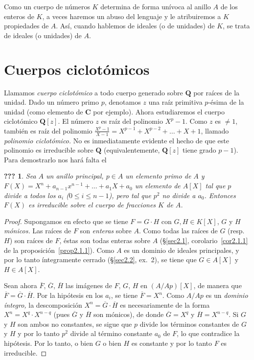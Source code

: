 \documentclass[oneside,bibtotoc,leqno,spanish]{amsbook}
\newcommand{\QQ}{\mathbf{Q}}
\newcommand{\CC}{\mathbf{C}}
\newcommand{\QED}{}%
\newcommand{\oline}[1]{\overline{#1}}
\numberwithin{equation}{section}
\theoremstyle{defi}
\theoremstyle{note}
\newcommand{\namedname}{???}
\newtheorem*{namedthm}{\namedname}
\newenvironment{named}[1]%
	{\renewcommand{\namedname}{#1}%
	\begin{namedthm}}%
	{\end{namedthm}}
\theoremstyle{rem}
\numberwithin{theorem}{section}
\numberwithin{proposition}{section}
\numberwithin{definition}{section}
\numberwithin{lemma}{section}
\numberwithin{corollary}{section}
\numberwithin{example}{section}
\numberwithin{footnote}{section}%
\begin{document}
Como un cuerpo de n\'umeros $K$ determina de forma un\'ivoca al anillo $A$ de los enteros de $K$, a veces
haremos un abuso del lenguaje y le atribuiremos a $K$ propiedades de $A$. As\'i, cuando hablemos
de ideales (o de unidades) de $K$, se trata de ideales (o unidades) de $A$.

\section{Cuerpos ciclot\'omicos}\label{sec2.9}

Llamamos {\em cuerpo ciclot\'omico} a todo cuerpo generado sobre $\QQ$ por ra\'ices de la unidad. Dado
un n\'umero primo $p$, denotamos $z$ una ra\'iz primitiva $p$-\'esima de la unidad (como elemento
de $\CC$ por ejemplo). Ahora estudiaremos el cuerpo ciclot\'omico $\QQ[z]$.
El n\'umero $z$ es ra\'iz del polinomio $X^{p}-1$. Como $z$ es $\neq 1$, tambi\'en es ra\'iz del polinomio
$\frac{X^{p}-1}{X-1} = X^{p-1}+X^{p-2}+\dots+X+1$, llamado {\em polinomio ciclot\'omico.} No es inmediatamente
evidente el hecho de que este polinomio es irreducible sobre $\QQ$ (equivalentemente, $\QQ[z]$ tiene
grado $p-1$). Para demostrarlo nos har\'a falta el

\begin{named}{Criterio de Eisenstein}
Sea $A$ un anillo principal, $p\in A$ un elemento primo de $A$ y $F(X) = X^{n}+a_{n-1}x^{n-1}+\dots+a_{1}X+a_{0}$
un elemento de $A[X]$ tal que $p$ divide a todos los $a_{i}$ ($0\leq i\leq n-1${\upshape),} pero tal que $p^{2}$ no
divide a $a_{0}$. Entonces $F(X)$ es irreducible sobre el cuerpo de fracciones $K$ de $A$.
\end{named}

\begin{proof}
Supongamos en efecto que se tiene $F = G\cdot H$ con $G, H\in K[X]$, $G$ y $H$ {\em m\'onicos.} Las
ra\'ices de $F$ son {\em enteras} sobre $A$. Como todas las ra\'ices de $G$ (resp. $H$) son ra\'ices de $F$, \'estas
son todas enteras sobre $A$ (\S\ref{sec2.1}, corolario~\ref{cor2.1.1} de la proposici\'on~\ref{prop2.1.1}). Como $A$ es un dominio de ideales principales, y por
lo tanto \'integramente cerrado (\S\ref{sec2.2}, ex.~2), se tiene que $G\in A[X]$ y $H\in A[X]$.

Sean ahora $\oline F$, $\oline G$, $\oline H$ las im\'agenes de $F$, $G$, $H$ en $(A/Ap)[X]$, de manera que
$\oline F = \oline G\cdot\oline H$. Por la hip\'otesis en los $a_{i}$, se tiene $\oline F = X^{n}$.
Como $A/Ap$ es un {\em dominio \'integro,} la descomposici\'on $X^{n}=\oline G\cdot\oline H$ es necesariamente
de la forma $X^{n}=X^{q}\cdot X^{n-q}$ (pues $\oline G$ y $\oline H$ son m\'onicos), de donde
$\oline G = X^{q}$ y $\oline H = X^{n-q}$. Si $G$ y $H$ son ambos no constantes, se sigue que
$p$ divide los t\'erminos constantes de $G$ y $H$ y por lo tanto $p^{2}$ divide al t\'ermino constante
$a_{0}$ de $F$, lo que contradice la hip\'otesis. Por lo tanto, o bien $G$ o bien $H$ es constante y por
lo tanto $F$ es irreducible. \QED
\end{proof}
\end{document}
